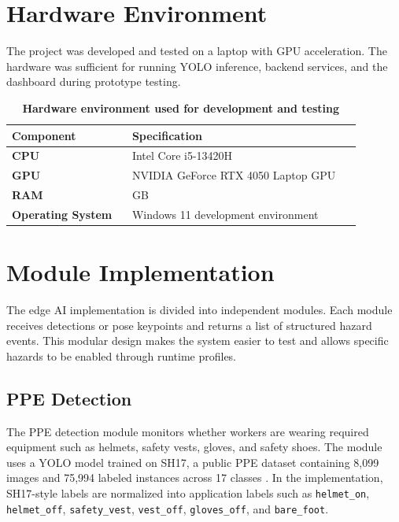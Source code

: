 \section{Hardware Environment}

The project was developed and tested on a laptop with GPU acceleration. The hardware was sufficient for running YOLO inference, backend services, and the dashboard during prototype testing.

\begin{table}[H]
\centering
\renewcommand{\arraystretch}{1.55}
\begin{tabular}{|>{\centering\arraybackslash}p{0.3\linewidth}|>{\centering\arraybackslash}p{0.58\linewidth}|}
\hline
\textbf{Component} & \textbf{Specification} \\
\hline
\textbf{CPU} & Intel Core i5-13420H \\
\hline
\textbf{GPU} & NVIDIA GeForce RTX 4050 Laptop GPU \\
\hline
\textbf{RAM} & 16 GB \\
\hline
\textbf{Operating System} & Windows 11 development environment \\
\hline
\end{tabular}
\caption{\textbf{Hardware environment used for development and testing}}
\label{tab:chapter5-hardware}
\end{table}

\section{Module Implementation}

The edge AI implementation is divided into independent modules. Each module receives detections or pose keypoints and returns a list of structured hazard events. This modular design makes the system easier to test and allows specific hazards to be enabled through runtime profiles.

\subsection{PPE Detection}

The PPE detection module monitors whether workers are wearing required equipment such as helmets, safety vests, gloves, and safety shoes. The module uses a YOLO model trained on SH17, a public PPE dataset containing 8,099 images and 75,994 labeled instances across 17 classes \cite{ahmad2024sh17}. In the implementation, SH17-style labels are normalized into application labels such as \texttt{helmet\_on}, \texttt{helmet\_off}, \texttt{safety\_vest}, \texttt{vest\_off}, \texttt{gloves\_off}, and \texttt{bare\_foot}.

